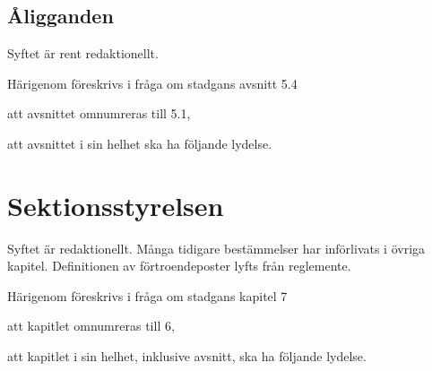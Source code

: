 \documentclass{article}
\begin{document}
\setcounter{subsection}{0}
\subsection{Åligganden}
Syftet är rent redaktionellt.

Härigenom föreskrivs i fråga om stadgans avsnitt 5.4
\begin{dels}
    \item att avsnittet omnumreras till 5.1,
    \item att avsnittet i sin helhet ska ha följande lydelse.
\end{dels}



\section{Sektionsstyrelsen}
Syftet är redaktionellt.
Många tidigare bestämmelser har införlivats i övriga kapitel.
Definitionen av förtroendeposter lyfts från reglemente.

Härigenom föreskrivs i fråga om stadgans kapitel 7
\begin{dels}
  \item att kapitlet omnumreras till 6,
  \item att kapitlet i sin helhet, inklusive avsnitt, ska ha följande lydelse.
\end{dels}
\end{document}
